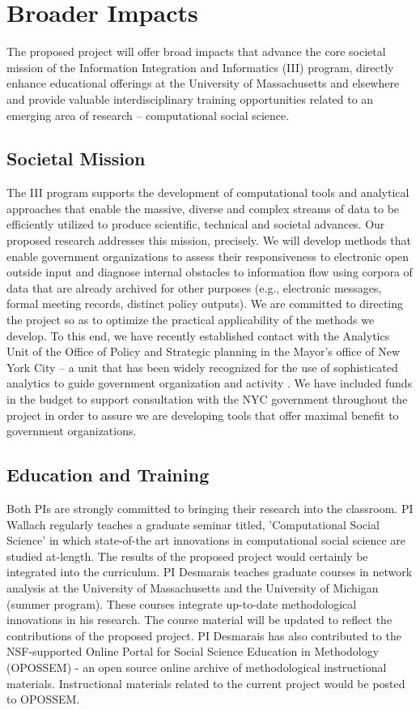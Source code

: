 \section{Broader Impacts}

The proposed project will offer broad impacts that advance the core societal mission of the Information Integration and Informatics (III) program, directly enhance educational offerings at the University of Massachusetts and elsewhere and provide valuable interdisciplinary training opportunities related to an emerging area of research -- computational social science.

\subsection{Societal Mission}

The III program supports the development of computational tools and analytical approaches that enable the massive, diverse and complex streams of data to be efficiently utilized to produce scientific, technical and societal advances. Our proposed research addresses this mission, precisely. We will develop methods that enable government organizations to assess their responsiveness to electronic open outside input and diagnose internal obstacles to information flow using corpora of data that are already archived for other purposes (e.g., electronic messages, formal meeting records, distinct policy outputs). We are committed to directing the project so as to optimize the practical applicability of the methods we develop. To this end, we have recently established contact with the Analytics Unit of the Office of Policy and Strategic planning in the Mayor's office of New York City -- a unit that has been widely recognized for the use of sophisticated analytics to guide government organization and activity \cite{Hoffmann2012}. We have included funds in the budget to support consultation with the NYC government throughout the project in order to assure we are developing tools that offer maximal benefit to government organizations.

\subsection{Education and Training}

Both PIs are strongly committed to bringing their research into the classroom. PI Wallach regularly teaches a graduate seminar titled, 'Computational Social Science' in which state-of-the art innovations in computational social science are studied at-length. The results of the proposed project would certainly be integrated into the curriculum. PI Desmarais teaches graduate courses in network analysis at the University of Massachusetts and the University of Michigan (summer program). These courses integrate up-to-date methodological innovations in his research. The course material will be updated to reflect the contributions of the proposed project. PI Desmarais has also contributed to the NSF-supported Online Portal for Social Science Education in Methodology (OPOSSEM) - an open source online archive of methodological instructional materials. Instructional materials related to the current project would be posted to OPOSSEM.

